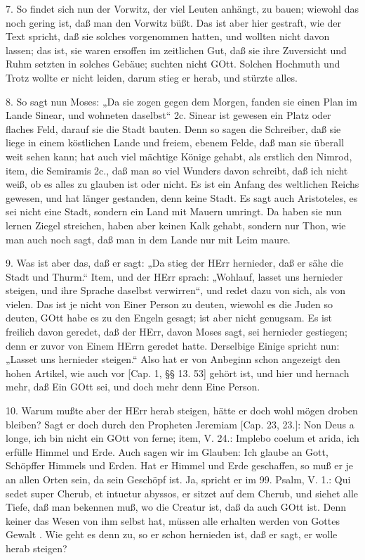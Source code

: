 7. So findet sich nun der Vorwitz, der viel Leuten anhängt, zu bauen; wiewohl das noch gering ist, daß man den Vorwitz büßt. Das ist aber hier gestraft, wie der Text spricht, daß sie solches vorgenommen hatten, und wollten nicht davon lassen; das ist, sie waren ersoffen im zeitlichen Gut, daß sie ihre Zuversicht und Ruhm setzten in solches Gebäue; suchten nicht GOtt. Solchen Hochmuth und Trotz wollte er nicht leiden, darum stieg er herab, und stürzte alles.

8. So sagt nun Moses: „Da sie zogen gegen dem Morgen, fanden sie einen Plan im Lande Sinear, und wohneten daselbst“ 2c. Sinear ist gewesen ein Platz oder flaches Feld, darauf sie die Stadt bauten. Denn so sagen die Schreiber, daß sie liege in einem köstlichen Lande und freiem, ebenem Felde, daß man sie überall weit sehen kann; hat auch viel mächtige Könige gehabt, als erstlich den Nimrod, item, die Semiramis 2c., daß man so viel Wunders davon schreibt, daß ich nicht weiß, ob es alles zu glauben ist oder nicht. Es ist ein Anfang des weltlichen Reichs gewesen, und hat länger gestanden, denn keine Stadt. Es sagt auch Aristoteles, es sei nicht eine Stadt, sondern ein Land mit Mauern umringt. Da haben sie nun lernen Ziegel streichen, haben aber keinen Kalk gehabt, sondern nur Thon, wie man auch noch sagt, daß man in dem Lande nur mit Leim maure.

9. Was ist aber das, daß er sagt: „Da stieg der HErr hernieder, daß er sähe die Stadt und Thurm.“ Item, und der HErr sprach: „Wohlauf, lasset uns hernieder steigen, und ihre Sprache daselbst verwirren“, und redet dazu von sich, als von vielen. Das ist je nicht von Einer Person zu deuten, wiewohl es die Juden so deuten, GOtt habe es zu den Engeln gesagt; ist aber nicht genugsam. Es ist freilich davon geredet, daß der HErr, davon Moses sagt, sei hernieder gestiegen; denn er zuvor von Einem HErrn geredet hatte. Derselbige Einige spricht nun: „Lasset uns hernieder steigen.“ Also hat er von Anbeginn schon angezeigt den hohen Artikel, wie auch vor [Cap. 1, §§ 13. 53] gehört ist, und hier und hernach mehr, daß Ein GOtt sei, und doch mehr denn Eine Person.

10. Warum mußte aber der HErr herab steigen, hätte er doch wohl mögen droben bleiben? Sagt er doch durch den Propheten Jeremiam [Cap. 23, 23.]: Non Deus a longe, ich bin nicht ein GOtt von ferne; item, V. 24.: Implebo coelum et arida, ich erfülle Himmel und Erde. Auch sagen wir im Glauben: Ich glaube an Gott, Schöpffer Himmels und Erden. Hat er Himmel und Erde geschaffen, so muß er je an allen Orten sein, da sein Geschöpf ist. Ja, spricht er im 99. Psalm, V. 1.: Qui sedet super Cherub, et intuetur abyssos, er sitzet auf dem Cherub, und siehet alle Tiefe, daß man bekennen muß, wo die Creatur ist, daß da auch GOtt ist. Denn keiner das Wesen von ihm selbst hat, müssen alle erhalten werden von Gottes Gewalt
. Wie geht es denn zu, so er schon hernieden ist, daß er sagt, er wolle herab steigen?

